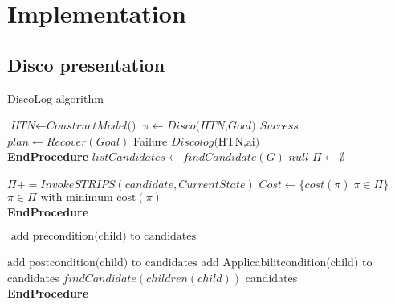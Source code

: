 \documentclass{article}
\begin{document}
	

\chapter{Implementation} %

\label{Chapter 4} %



\section{Disco presentation}
\begin{algorithm}
\caption{DiscoLog algorithm}\label{euclid}
\begin{algorithmic}[]
\State $\textit{HTN} \gets\textit{ConstructModel()} $
\State $\pi \gets Disco \textit{(HTN,Goal)}$
\State \Return $\textit{Success} $
\Else 
\State$ plan \gets Recover(Goal)$
\State \Return Failure
\Else 
{}
\State  $\textit{Discolog} \text{(HTN,ai)}$
\EndFor
\EndIf
\EndIf
\\
\EndProcedure \textbf{EndProcedure}
\State 
{}
\State $\textit{listCandidates}\gets\textit{findCandidate}{(G)} $
\State \Return $\textit{null} $
\Else 
\State $\Pi \gets \emptyset$

\State $\Pi += InvokeSTRIPS(candidate,CurrentState)$
\State  $Cost \gets \{ cost(\pi) | \pi \in  \Pi \} $
\EndFor
\EndIf
\State \Return $\pi \in \Pi \text{ with minimum cost}(\pi)$
\\
\EndProcedure \textbf{EndProcedure}

\State 
{}
 
\State $  \text{ add precondition(child) to candidates}$

\State $\text{add postcondition(child) to candidates}$
\EndIf
{}
\State add Applicabilitcondition(child) to candidates
\EndIf
\State $\textit{findCandidate} (children(child))$
\EndFor
\State \Return candidates
\\
\EndProcedure \textbf{EndProcedure}

\end{algorithmic}
\end{algorithm}
\end{document}
